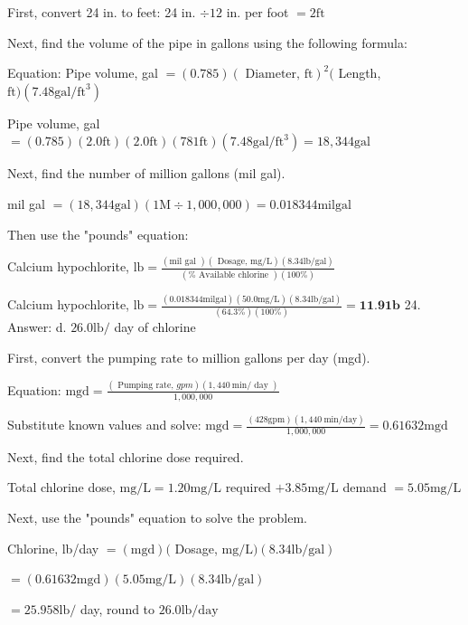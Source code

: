 \documentclass[10pt]{article}
\begin{document}
First, convert 24 in. to feet: 24 in. $\div 12$ in. per foot $=2 \mathrm{ft}$

Next, find the volume of the pipe in gallons using the following formula:

Equation: Pipe volume, gal $=(0.785)(\text { Diameter, } \mathrm{ft})^{2}($ Length, $\mathrm{ft})\left(7.48 \mathrm{gal} / \mathrm{ft}^{3}\right)$

Pipe volume, gal $=(0.785)(2.0 \mathrm{ft})(2.0 \mathrm{ft})(781 \mathrm{ft})\left(7.48 \mathrm{gal} / \mathrm{ft}^{3}\right)=18,344 \mathrm{gal}$

Next, find the number of million gallons (mil gal).

mil gal $=(18,344 \mathrm{gal})(1 \mathrm{M} \div 1,000,000)=0.018344 \mathrm{mil} \mathrm{gal}$

Then use the "pounds" equation:

Calcium hypochlorite, $\mathrm{lb}=\frac{(\mathrm{mil} \text { gal })(\text { Dosage, } \mathrm{mg} / \mathrm{L})(8.34 \mathrm{lb} / \mathrm{gal})}{(\% \text { Available chlorine })(100 \%)}$

Calcium hypochlorite, $\mathrm{lb}=\frac{(0.018344 \mathrm{mil} \mathrm{gal})(50.0 \mathrm{mg} / \mathrm{L})(8.34 \mathrm{lb} / \mathrm{gal})}{(64.3 \%)(100 \%)}=\mathbf{1 1 . 9} \mathbf{1 b}$ 24. Answer: d. $26.0 \mathrm{lb} /$ day of chlorine

First, convert the pumping rate to million gallons per day (mgd).

Equation: $\mathrm{mgd}=\frac{(\text { Pumping rate, } g p m)(1,440 \mathrm{~min} / \text { day })}{1,000,000}$

Substitute known values and solve: $\mathrm{mgd}=\frac{(428 \mathrm{gpm})(1,440 \mathrm{~min} / \mathrm{day})}{1,000,000}=0.61632 \mathrm{mgd}$

Next, find the total chlorine dose required.

Total chlorine dose, $\mathrm{mg} / \mathrm{L}=1.20 \mathrm{mg} / \mathrm{L}$ required $+3.85 \mathrm{mg} / \mathrm{L}$ demand $=5.05 \mathrm{mg} / \mathrm{L}$

Next, use the "pounds" equation to solve the problem.

Chlorine, lb/day $=(\mathrm{mgd})($ Dosage, $\mathrm{mg} / \mathrm{L})(8.34 \mathrm{lb} / \mathrm{gal})$

$=(0.61632 \mathrm{mgd})(5.05 \mathrm{mg} / \mathrm{L})(8.34 \mathrm{lb} / \mathrm{gal})$

$=25.958 \mathrm{lb} /$ day, round to $26.0 \mathrm{lb} / \mathrm{day}$
\end{document}
